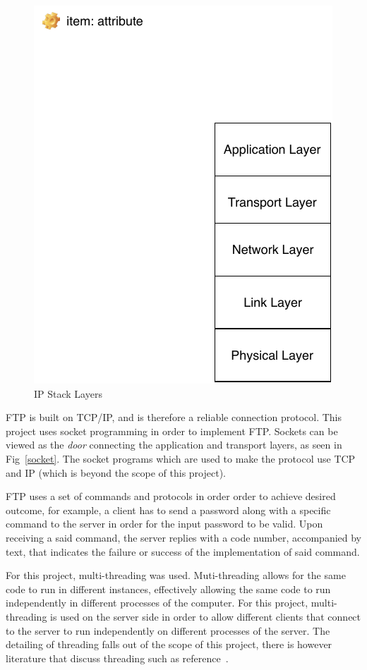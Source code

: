 \documentclass[journal, a4paper]{IEEEtran}
\begin{document}
\begin{figure}[hbtp!]
	\centering
	\includegraphics[scale = 1.2]{IPStack}
	\caption{IP Stack Layers}
	\label {ipstack}
\end{figure}


FTP is built on TCP/IP, and is therefore a reliable connection protocol. This project uses socket programming in order to implement FTP. Sockets can be viewed as the \textit{door} connecting the application and transport layers, as seen in Fig~\ref{socket}. The socket programs which are used to make the protocol use TCP and IP (which is beyond the scope of this project). 

FTP uses a set of commands and protocols in order order to achieve desired outcome, for example, a client has to send a password along with a specific command to the server in order for the input password to be valid. Upon receiving a said command, the server replies with a code number, accompanied by text, that indicates the failure or success of the implementation of said command. 


For this project, multi-threading was used. Muti-threading allows for the same code to run in different instances, effectively allowing the same code to run independently in different processes of the computer. For this project, multi-threading is used on the server side in order to allow different clients that connect to the server to run independently on different processes of the server. The detailing of threading falls out of the scope of this project, there is however literature that discuss threading such as reference~\cite{fop}.
\end{document}
